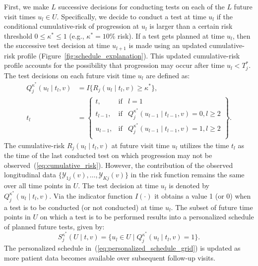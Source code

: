 First, we make $L$ successive decisions for conducting tests on each of the $L$ future visit times $u_l \in U$. Specifically, we decide to conduct a test at time $u_l$ if the conditional cumulative-risk of progression at $u_l$ is larger than a certain risk threshold $0 \leq \kappa^* \leq 1$ (e.g., $\kappa^*=10$\% risk). If a test gets planned at time $u_l$, then the successive test decision at time $u_{l+1}$ is made using an updated cumulative-risk profile (Figure~\ref{fig:schedule_explanation}). This updated cumulative-risk profile accounts for the possibility that progression may occur after time $u_l < T^*_j$. The test decisions on each future visit time $u_l$ are defined as: 
\begin{equation*}
\label{eq:personalized_decision_grid}
\begin{split}
Q_j^{\kappa^*}(u_l \mid t_l, v) &= I\big\{R_j(u_l \mid t_l, v) \geq \kappa^* \big\},\\
t_l &= \left\{\begin{array}{lcr}
  t, &\mbox{if}& l=1\\
  t_{l-1}, &\mbox{if}&  Q_j^{\kappa^*}(u_{l-1} \mid t_{l-1}, v)=0, l\geq 2\\ 
  u_{l-1}, &\mbox{if}&  Q_j^{\kappa^*}(u_{l-1} \mid t_{l-1}, v)=1, l\geq 2\\
\end{array} \right\}.
\end{split}
\end{equation*}
The cumulative-risk $R_j(u_l \mid t_l, v)$ at future visit time $u_l$ utilizes the time $t_l$ as the time of the last conducted test on which progression may not be observed~(\ref{eq:cumulative_risk}). However, the contribution of the observed longitudinal data $\{\mathcal{Y}_{1j}(v), \ldots, \mathcal{Y}_{Kj}(v)\}$ in the risk function remains the same over all time points in $U$. The test decision at time $u_l$ is denoted by ${Q_j^{\kappa^*}(u_l \mid t_l, v)}$. Via the indicator function $I(\cdot)$ it obtains a value 1 (or 0) when a test is to be conducted (or not conducted) at time $u_l$. The subset of future time points in $U$ on which a test is to be performed results into a personalized schedule of planned future tests, given by:
\begin{equation}
\label{eq:personalized_schedule_grid}
S_j^{\kappa^*}(U \mid t, v) = \big\{ u_l \in U \mid Q_j^{\kappa^*}(u_l \mid t_l, v)=1\big\}.
\end{equation}
The personalized schedule in~(\ref{eq:personalized_schedule_grid}) is updated as more patient data becomes available over subsequent follow-up visits.

